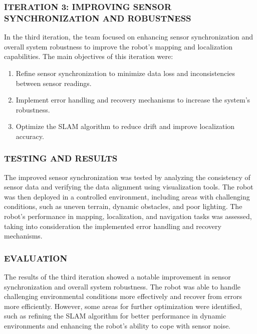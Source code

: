 \documentclass[12pt]{article}
\begin{document}
    \subsubsection{ITERATION 3: IMPROVING SENSOR SYNCHRONIZATION AND ROBUSTNESS}

    In the third iteration, the team focused on enhancing sensor synchronization and overall system robustness to improve the robot's mapping and localization capabilities. The main objectives of this iteration were:
    
    \begin{enumerate}
        \item Refine sensor synchronization to minimize data loss and inconsistencies between sensor readings.
        \item Implement error handling and recovery mechanisms to increase the system's robustness.
        \item Optimize the SLAM algorithm to reduce drift and improve localization accuracy.
    \end{enumerate}
    
        \subsubsection{TESTING AND RESULTS}
        
        The improved sensor synchronization was tested by analyzing the consistency of sensor data and verifying the data alignment using visualization tools. The robot was then deployed in a controlled environment, including areas with challenging conditions, such as uneven terrain, dynamic obstacles, and poor lighting. The robot's performance in mapping, localization, and navigation tasks was assessed, taking into consideration the implemented error handling and recovery mechanisms.
        
        \subsubsection{EVALUATION}
        
        The results of the third iteration showed a notable improvement in sensor synchronization and overall system robustness. The robot was able to handle challenging environmental conditions more effectively and recover from errors more efficiently. However, some areas for further optimization were identified, such as refining the SLAM algorithm for better performance in dynamic environments and enhancing the robot's ability to cope with sensor noise.
    
\end{document}
